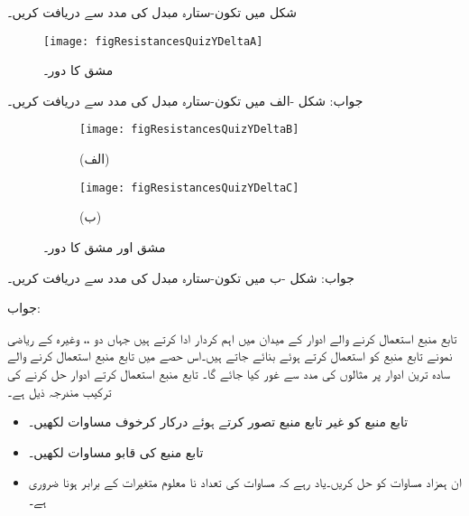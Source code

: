 \FloatBarrier
{}
شکل  میں تکون-ستارہ مبدل کی مدد سے  دریافت کریں۔
\begin{figure}
\centering
\texttt{[image: figResistancesQuizYDeltaA]}
\caption{مشق  کا دور۔}
\label{شکل_مزاحمتی_مشق_تکون_ستارہ_الف}
\end{figure}

جواب: 
\FloatBarrier
{}
شکل -الف میں تکون-ستارہ مبدل کی مدد سے  دریافت کریں۔
\begin{figure}
\centering
\begin{subfigure}{0.5\textwidth}
\centering
\texttt{[image: figResistancesQuizYDeltaB]}
\caption*{(الف)}
\end{subfigure}%
\begin{subfigure}{0.5\textwidth}
\centering
\texttt{[image: figResistancesQuizYDeltaC]}
\caption*{(ب)}
\end{subfigure}%
\caption{مشق  اور مشق  کا دور۔}
\label{شکل_مزاحمتی_مشق_تکون_ستارہ_ب}
\end{figure}

جواب: 
\FloatBarrier
{}
شکل -ب میں تکون-ستارہ مبدل کی مدد سے  دریافت کریں۔


جواب: 

تابع منبع استعمال کرنے والے ادوار  کے میدان میں اہم کردار ادا کرتے ہیں جہاں دو ،،   وغیرہ کے ریاضی نمونے تابع منبع کو استعمال کرتے ہوئے بنائے جاتے ہیں۔اس حصے میں تابع منبع استعمال کرنے والے سادہ ترین ادوار پر مثالوں کی مدد سے غور کیا جائے گا۔ تابع منبع استعمال کرتے ادوار حل کرنے کی ترکیب مندرجہ ذیل ہے۔

\begin{itemize}
\item
تابع منبع کو غیر تابع منبع تصور کرتے ہوئے درکار کرخوف مساوات لکھیں۔
\item
تابع منبع کی قابو مساوات لکھیں۔
\item
ان ہمزاد مساوات کو حل کریں۔یاد رہے کہ مساوات کی تعداد نا معلوم متغیرات کے برابر ہونا ضروری ہے۔  
\end{itemize}

